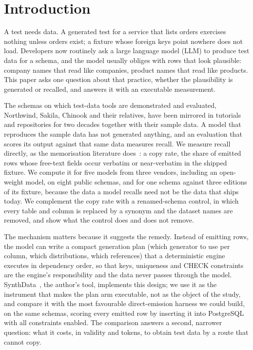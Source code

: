 \documentclass[preprint,12pt]{elsarticle}
\begin{document}
\linenumbers

\section{Introduction}
\label{sec:intro}

A test needs data. A generated test for a service that lists orders exercises nothing unless orders exist; a fixture whose foreign keys point nowhere does not load. Developers now routinely ask a large language model (LLM) to produce test data for a schema, and the model usually obliges with rows that look plausible: company names that read like companies, product names that read like products. This paper asks one question about that practice, whether the plausibility is generated or recalled, and answers it with an executable measurement.

The schemas on which test-data tools are demonstrated and evaluated, Northwind, Sakila, Chinook and their relatives, have been mirrored in tutorials and repositories for two decades together with their sample data. A model that reproduces the sample data has not generated anything, and an evaluation that scores its output against that same data measures recall. We measure recall directly, as the memorisation literature does~\cite{carlini2023quantifying,riddell2024contamination}: a copy rate, the share of emitted rows whose free-text fields occur verbatim or near-verbatim in the shipped fixture. We compute it for five models from three vendors, including an open-weight model, on eight public schemas, and for one schema against three editions of its fixture, because the data a model recalls need not be the data that ships today. We complement the copy rate with a renamed-schema control, in which every table and column is replaced by a synonym and the dataset names are removed, and show what the control does and does not remove.

The mechanism matters because it suggests the remedy. Instead of emitting rows, the model can write a compact generation plan (which generator to use per column, which distributions, which references) that a deterministic engine executes in dependency order, so that keys, uniqueness and CHECK constraints are the engine's responsibility and the data never passes through the model. SynthData~\cite{synthdata}, the author's tool, implements this design; we use it as the instrument that makes the plan arm executable, not as the object of the study, and compare it with the most favourable direct-emission harness we could build, on the same schemas, scoring every emitted row by inserting it into PostgreSQL with all constraints enabled. The comparison answers a second, narrower question: what it costs, in validity and tokens, to obtain test data by a route that cannot copy.
\end{document}
